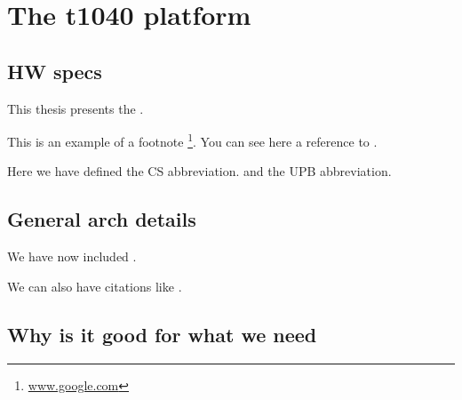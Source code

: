 \chapter{The t1040 platform}
\label{chapter:t1040-platform}


\section{HW specs}
\label{sec:specs}

This thesis presents the \textbf{\project}.

This is an example of a footnote \footnote{\url{www.google.com}}. You can see here a reference to .

Here we have defined the CS abbreviation. and the UPB abbreviation.


\section{General arch details}
\label{sub-sec:arch-details}

We have now included .




We can also have citations like \cite{iso-odf}.

\section{Why is it good for what we need}


